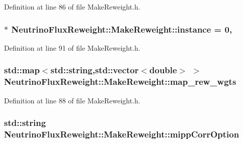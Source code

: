 Definition at line 86 of file Make\-Reweight.\-h.

\hypertarget{class_neutrino_flux_reweight_1_1_make_reweight_a75fcb02b8cf89ed906f143d3b782b27a}{
\subsubsection[{instance}]{ $\ast$ Neutrino\-Flux\-Reweight\-::\-Make\-Reweight\-::instance = 0\hspace{0.3cm}{\ttfamily [static]}, {\ttfamily [private]}}}\label{class_neutrino_flux_reweight_1_1_make_reweight_a75fcb02b8cf89ed906f143d3b782b27a}


Definition at line 91 of file Make\-Reweight.\-h.

\hypertarget{class_neutrino_flux_reweight_1_1_make_reweight_a2310ee6ae4dd8e0cd2d58c089192e38a}{
\subsubsection[{map\-\_\-rew\-\_\-wgts}]{\setlength{\rightskip}{0pt plus 5cm}std\-::map$<$std\-::string,std\-::vector$<$double$>$ $>$ Neutrino\-Flux\-Reweight\-::\-Make\-Reweight\-::map\-\_\-rew\-\_\-wgts\hspace{0.3cm}{\ttfamily [private]}}}\label{class_neutrino_flux_reweight_1_1_make_reweight_a2310ee6ae4dd8e0cd2d58c089192e38a}


Definition at line 88 of file Make\-Reweight.\-h.

\hypertarget{class_neutrino_flux_reweight_1_1_make_reweight_a642f0605b4a34674afaf5add7512c66a}{
\subsubsection[{mipp\-Corr\-Option}]{\setlength{\rightskip}{0pt plus 5cm}std\-::string Neutrino\-Flux\-Reweight\-::\-Make\-Reweight\-::mipp\-Corr\-Option\hspace{0.3cm}{\ttfamily [private]}}}\label{class_neutrino_flux_reweight_1_1_make_reweight_a642f0605b4a34674afaf5add7512c66a}


